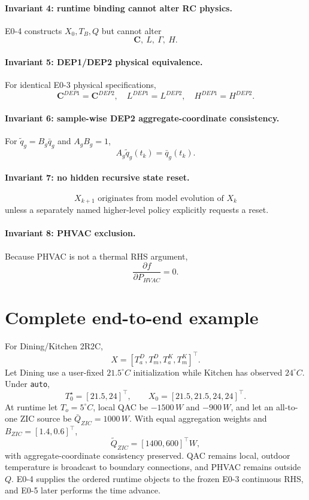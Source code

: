 \documentclass[11pt]{article}
\begin{document}
\paragraph{Invariant 4: runtime binding cannot alter RC physics.}
E0-4 constructs \(X_0,T_B,Q\) but cannot alter
\[
\boxed{\mathbf C,\ L,\ \Gamma,\ H}.
\]

\paragraph{Invariant 5: DEP1/DEP2 physical equivalence.}
For identical E0-3 physical specifications,
\[
\boxed{\mathbf C^{DEP1}=\mathbf C^{DEP2},\quad L^{DEP1}=L^{DEP2},\quad H^{DEP1}=H^{DEP2}}.
\]

\paragraph{Invariant 6: sample-wise DEP2 aggregate-coordinate consistency.}
For \(\widetilde q_g=B_g\bar q_g\) and \(A_gB_g=1\),
\[
\boxed{A_g\widetilde q_g(t_k)=\bar q_g(t_k)}.
\]

\paragraph{Invariant 7: no hidden recursive state reset.}
\[
\boxed{X_{k+1}\text{ originates from model evolution of }X_k}
\]
unless a separately named higher-level policy explicitly requests a reset.

\paragraph{Invariant 8: PHVAC exclusion.}
Because PHVAC is not a thermal RHS argument,
\[
\boxed{\frac{\partial f}{\partial P_{HVAC}}=0}.
\]

\section{Complete end-to-end example}
For Dining/Kitchen 2R2C,
\[
X=[T_a^D,T_m^D,T_a^K,T_m^K]^\top.
\]
Let Dining use a user-fixed \(21.5^\circ C\) initialization while Kitchen has observed
\(24^\circ C\). Under \texttt{auto},
\[
T_0^\star=[21.5,24]^\top,\qquad
\boxed{X_0=[21.5,21.5,24,24]^\top}.
\]
At runtime let \(T_o=5^\circ C\), local QAC be \(-1500\,W\) and \(-900\,W\), and let
an all-to-one ZIC source be \(\bar Q_{ZIC}=1000\,W\). With equal aggregation weights and
\(B_{ZIC}=[1.4,0.6]^\top\),
\[
\widetilde Q_{ZIC}=[1400,600]^\top W,
\]
with aggregate-coordinate consistency preserved. QAC remains local, outdoor temperature is
broadcast to boundary connections, and PHVAC remains outside \(Q\). E0-4 supplies the
ordered runtime objects to the frozen E0-3 continuous RHS, and E0-5 later performs the time
advance.
\end{document}
